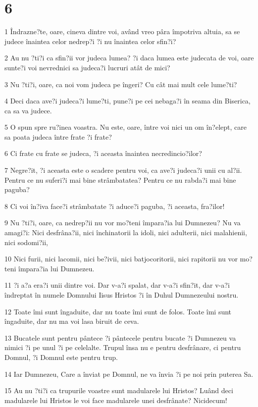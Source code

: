 \chapter{6}

\par 1 Îndrazne?te, oare, cineva dintre voi, având vreo pâra împotriva altuia, sa se judece înaintea celor nedrep?i ?i nu înaintea celor sfin?i?
\par 2 Au nu ?ti?i ca sfin?ii vor judeca lumea? ?i daca lumea este judecata de voi, oare sunte?i voi nevrednici sa judeca?i lucruri atât de mici?
\par 3 Nu ?ti?i, oare, ca noi vom judeca pe îngeri? Cu cât mai mult cele lume?ti?
\par 4 Deci daca ave?i judeca?i lume?ti, pune?i pe cei nebaga?i în seama din Biserica, ca sa va judece.
\par 5 O spun spre ru?inea voastra. Nu este, oare, între voi nici un om în?elept, care sa poata judeca între frate ?i frate?
\par 6 Ci frate cu frate se judeca, ?i aceasta înaintea necredincio?ilor?
\par 7 Negre?it, ?i aceasta este o scadere pentru voi, ca ave?i judeca?i unii cu al?ii. Pentru ce nu suferi?i mai bine strâmbatatea? Pentru ce nu rabda?i mai bine paguba?
\par 8 Ci voi în?iva face?i strâmbatate ?i aduce?i paguba, ?i aceasta, fra?ilor!
\par 9 Nu ?ti?i, oare, ca nedrep?ii nu vor mo?teni împara?ia lui Dumnezeu? Nu va amagi?i: Nici desfrâna?ii, nici închinatorii la idoli, nici adulterii, nici malahienii, nici sodomi?ii,
\par 10 Nici furii, nici lacomii, nici be?ivii, nici batjocoritorii, nici rapitorii nu vor mo?teni împara?ia lui Dumnezeu.
\par 11 ?i a?a era?i unii dintre voi. Dar v-a?i spalat, dar v-a?i sfin?it, dar v-a?i îndreptat în numele Domnului Iisus Hristos ?i în Duhul Dumnezeului nostru.
\par 12 Toate îmi sunt îngaduite, dar nu toate îmi sunt de folos. Toate îmi sunt îngaduite, dar nu ma voi lasa biruit de ceva.
\par 13 Bucatele sunt pentru pântece ?i pântecele pentru bucate ?i Dumnezeu va nimici ?i pe unul ?i pe celelalte. Trupul însa nu e pentru desfrânare, ci pentru Domnul, ?i Domnul este pentru trup.
\par 14 Iar Dumnezeu, Care a înviat pe Domnul, ne va învia ?i pe noi prin puterea Sa.
\par 15 Au nu ?ti?i ca trupurile voastre sunt madularele lui Hristos? Luând deci madularele lui Hristos le voi face madularele unei desfrânate? Nicidecum!
